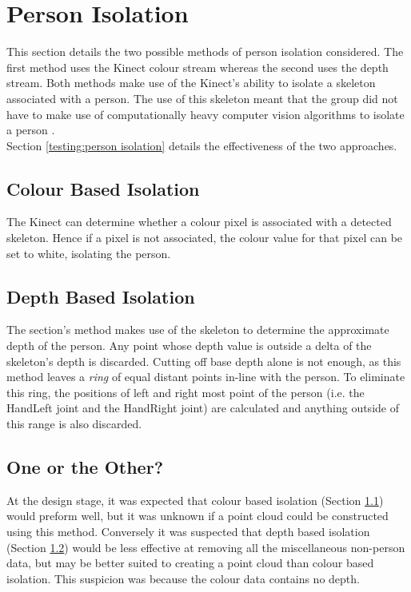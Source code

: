 \section{Person Isolation}
\label{design:person isolation}
This section details the two possible methods of person isolation considered.
The first method uses the Kinect colour stream whereas the second uses the depth stream.
Both methods make use of the Kinect's ability to isolate a skeleton associated with a person.
The use of this skeleton meant that the group did not have to make use of computationally heavy computer vision algorithms to isolate a person .\\

Section \ref{testing:person isolation} details the effectiveness of the two approaches.

\subsection{Colour Based Isolation}
\label{design:colour based isolation}
The Kinect can determine whether a colour pixel is associated with a detected skeleton. 
Hence if a pixel is not associated, the colour value for that pixel can be set to white, isolating the person.\\

\subsection{Depth Based Isolation}
\label{design:depth based isolation}
The section's method makes use of the skeleton to determine the approximate depth of the person. 
Any point whose depth value is outside a delta of the skeleton's depth is discarded.
Cutting off base depth alone is not enough, as this method leaves a \textit{ring} of equal distant points in-line with the person. 
To eliminate this ring, the positions of left and right most point of the person (i.e. the HandLeft joint and the HandRight joint) are calculated and anything outside of this range is also discarded. \\

\subsection{One or the Other?}
\label{design:one or the other?}
At the design stage, it was expected that colour based isolation (Section \ref{design:colour based isolation}) would preform well, but it was unknown if a point cloud could be constructed using this method. 
Conversely it was suspected that depth based isolation (Section \ref{design:depth based isolation}) would be less effective at removing all the miscellaneous non-person data, but may be better suited to creating a point cloud than colour based isolation. This suspicion was because the colour data contains no depth.\\ 